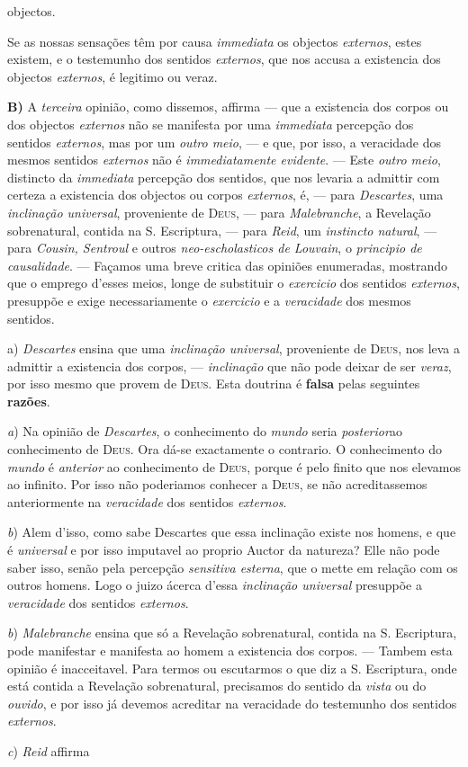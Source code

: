 objectos.\par Se as nossas sensações têm por causa \emph{immediata} os objectos \emph{externos}, estes existem, e o testemunho dos sentidos \emph{externos}, que nos accusa a existencia dos objectos \emph{externos}, é legitimo ou veraz.\par \textbf{B)} A \emph{terceira} opinião, como dissemos, affirma --- que a existencia dos corpos ou dos objectos \emph{externos} não se manifesta por uma \emph{immediata} percepção dos sentidos \emph{externos}, mas por um \emph{outro meio}, --- e que, por isso, a veracidade dos mesmos sentidos \emph{externos} não é \emph{immediatamente evidente}. --- Este \emph{outro meio}, distincto da \emph{immediata} percepção dos sentidos, que nos levaria a admittir com certeza a existencia dos objectos ou corpos \emph{externos}, é, --- para \emph{Descartes}, uma \emph{inclinação universal}, proveniente de \textsc{Deus}, --- para \emph{Malebranche}, a Revelação sobrenatural, contida na S. Escriptura, --- para \emph{Reid}, um \emph{instincto natural}, --- para \emph{Cousin, Sentroul} e outros \emph{neo-escholasticos de Louvain}, o \emph{principio de causalidade}. --- Façamos uma breve critica das opiniões enumeradas, mostrando que o emprego d'esses meios, longe de substituir o \emph{exercicio} dos sentidos \emph{externos}, presuppõe e exige necessariamente o \emph{exercicio} e a \emph{veracidade} dos mesmos sentidos.\par a) \emph{Descartes} ensina que uma \emph{inclinação universal}, proveniente de \textsc{Deus}, nos leva a admittir a existencia dos corpos, --- \emph{inclinação} que não pode deixar de ser \emph{veraz}, por isso mesmo que provem de \textsc{Deus}. Esta doutrina é \textbf{falsa} pelas seguintes \textbf{razões}.\par \emph{a}) Na opinião de \emph{Descartes}, o conhecimento do \emph{mundo} seria \emph{posterior}ao conhecimento de \textsc{Deus}. Ora dá-se exactamente o contrario. O conhecimento do \emph{mundo} é \emph{anterior} ao conhecimento de \textsc{Deus}, porque é pelo finito que nos elevamos ao infinito. Por isso não poderiamos conhecer a \textsc{Deus}, se não acreditassemos anteriormente na \emph{veracidade} dos sentidos \emph{externos}.\par \emph{b}) Alem d'isso, como sabe Descartes que essa inclinação existe nos homens, e que é \emph{universal} e por isso imputavel ao proprio Auctor da natureza? Elle não pode saber isso, senão pela percepção \emph{sensitiva esterna}, que o mette em relação com os outros homens. Logo o juizo ácerca d'essa \emph{inclinação universal} presuppõe a \emph{veracidade} dos sentidos \emph{externos}.\par \emph{b}) \emph{Malebranche} ensina que só a Revelação sobrenatural, contida na S. Escriptura, pode manifestar e manifesta ao homem a existencia dos corpos. --- Tambem esta opinião é inacceitavel. Para termos ou escutarmos o que diz a S. Escriptura, onde está contida a Revelação sobrenatural, precisamos do sentido da \emph{vista} ou do \emph{ouvido}, e por isso já devemos acreditar na veracidade do testemunho dos sentidos \emph{externos}.\par \emph{c}) \emph{Reid} affirma 